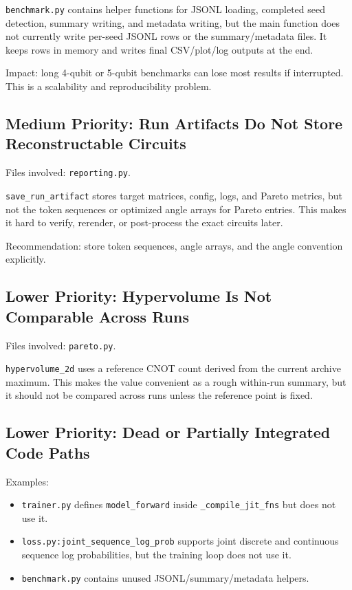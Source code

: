 \documentclass[11pt]{article}
\begin{document}
\texttt{benchmark.py} contains helper functions for JSONL loading, completed
seed detection, summary writing, and metadata writing, but the main function does
not currently write per-seed JSONL rows or the summary/metadata files.  It keeps
rows in memory and writes final CSV/plot/log outputs at the end.

Impact: long 4-qubit or 5-qubit benchmarks can lose most results if interrupted.
This is a scalability and reproducibility problem.

\subsection{Medium Priority: Run Artifacts Do Not Store Reconstructable Circuits}

Files involved: \texttt{reporting.py}.

\texttt{save\_run\_artifact} stores target matrices, config, logs, and Pareto
metrics, but not the token sequences or optimized angle arrays for Pareto
entries.  This makes it hard to verify, rerender, or post-process the exact
circuits later.

Recommendation: store token sequences, angle arrays, and the angle convention
explicitly.

\subsection{Lower Priority: Hypervolume Is Not Comparable Across Runs}

Files involved: \texttt{pareto.py}.

\texttt{hypervolume\_2d} uses a reference CNOT count derived from the current
archive maximum.  This makes the value convenient as a rough within-run summary,
but it should not be compared across runs unless the reference point is fixed.

\subsection{Lower Priority: Dead or Partially Integrated Code Paths}

Examples:

\begin{itemize}[leftmargin=*]
  \item \texttt{trainer.py} defines \texttt{model\_forward} inside
  \texttt{\_compile\_jit\_fns} but does not use it.
  \item \texttt{loss.py:joint\_sequence\_log\_prob} supports joint discrete and
  continuous sequence log probabilities, but the training loop does not use it.
  \item \texttt{benchmark.py} contains unused JSONL/summary/metadata helpers.
\end{itemize}
\end{document}
